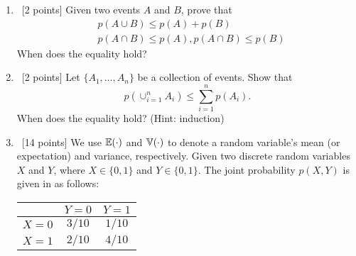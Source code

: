 \documentclass[12pt, fullpage,letterpaper]{article}
\begin{document}
%
\begin{enumerate}


\item~[2 points] Given two events $A$ and $B$, prove that 
\begin{align}
&p(A \cup B) \le p(A) + p(B) \nonumber \\
&p(A \cap B) \le p(A), p(A \cap B) \le p(B) \nonumber
\end{align}
When does the equality hold?
\item~[2 points] Let $\{A_1, \ldots, A_n\}$ be a collection of events. Show that
\[
p(\cup_{i=1}^n A_i) \le \sum_{i=1}^n p(A_i).
\]
When does the equality hold? (Hint: induction)
\item~[14 points]  We use $\mathbb{E}(\cdot)$ and $\mathbb{V}(\cdot)$ to denote a random variable's mean (or expectation) and variance, respectively. Given two discrete random variables $X$ and $Y$, where $X \in \{0, 1\}$ and $Y \in \{0,1\}$. The joint probability $p(X,Y)$ is given in as follows:
\begin{table}[h]
        \centering
        \begin{tabular}{ccc}
        \hline\hline
         & $Y=0$ & $Y=1$ \\ \hline
         $X=0$ & $3/10$ & $1/10$ \\ \hline
         $X=1$  & $2/10$ & $4/10$ \\ \hline\hline
        \end{tabular}
        \end{table}
	

\end{enumerate}
\end{document}
